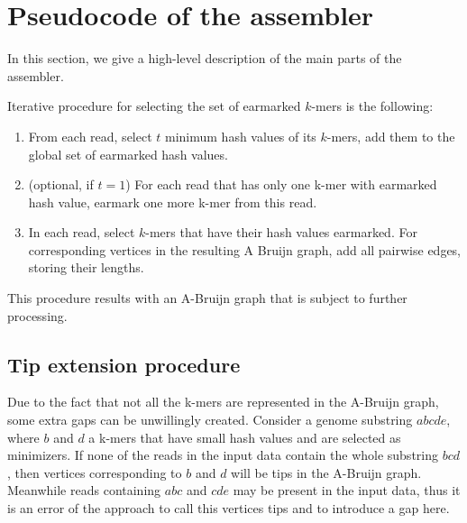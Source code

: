 \documentclass[12pt]{article}
\begin{document}

\section{Pseudocode of the assembler}
In this section, we give a high-level description of the main parts of the assembler.

Iterative procedure for selecting the set of earmarked $k$-mers is the following:

\begin{enumerate}
\item From each read, select $t$ minimum hash values of its $k$-mers, add them to the global set of earmarked hash values.
\item (optional, if $t=1$) For each read that has only one k-mer with earmarked hash value, earmark one more k-mer from this read.
\item In each read, select $k$-mers that have their hash values earmarked.
For corresponding vertices in the resulting A Bruijn graph, add all pairwise edges, storing their lengths.
\end{enumerate}

This procedure results with an A-Bruijn graph that is subject to further processing.

\subsection{Tip extension procedure}

Due to the fact that not all the k-mers are represented in the A-Bruijn graph,
some extra gaps can be unwillingly created.
Consider a genome substring $abcde$, where $b$ and $d$ a k-mers that have small hash values and are selected as minimizers.
If none of the reads in the input data contain the whole substring $bcd$, then vertices corresponding to
$b$ and $d$ will be tips in the A-Bruijn graph.
Meanwhile reads containing $abc$ and $cde$ may be present in the input data, thus it is an error of the approach
to call this vertices tips and to introduce a gap here.
\end{document}

